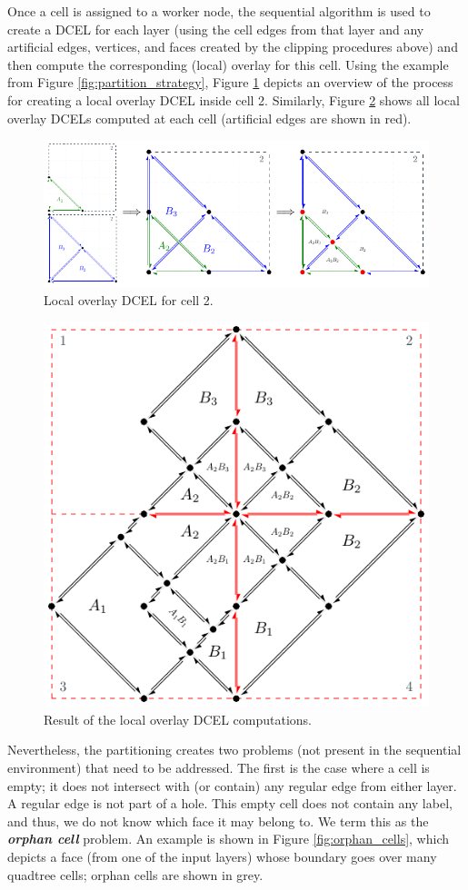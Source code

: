Once a cell is assigned to a worker node, the sequential algorithm is used to create a DCEL for each layer (using the cell edges from that layer and any artificial edges, vertices, and faces created by the clipping procedures above) and then compute the corresponding (local) overlay for this cell. Using the example from Figure \ref{fig:partition_strategy}, Figure \ref{fig:overlay_partition} depicts an overview of the process for creating a local overlay DCEL inside cell 2. Similarly, Figure \ref{fig:distributed_dcel} shows all local overlay DCELs computed at each cell (artificial edges are shown in red). 

\begin{figure}
    \centering
    \includegraphics[width=0.9\linewidth]{chapter2/overlay_partition.pdf}
    \caption{Local overlay DCEL for cell 2.}\label{fig:overlay_partition}
\end{figure}

\begin{figure}
    \centering
    \includegraphics[width=0.6\linewidth]{chapter2/distributed_dcel.pdf}    
    \caption{Result of the local overlay DCEL computations.}\label{fig:distributed_dcel}
\end{figure}

Nevertheless, the partitioning creates two problems (not present in the sequential environment) that need to be addressed. 
The first is the case where a cell is empty; it does not intersect with (or contain) any regular edge from either layer. A regular edge is not part of a hole.
This empty cell does not contain any label, and thus, we do not know which face it may belong to. We term this as the \textbf{\textit{orphan cell}} problem.
An example is shown in Figure \ref{fig:orphan_cells}, which depicts a face (from one of the input layers) whose boundary goes over many quadtree cells; orphan cells are shown in grey. 

